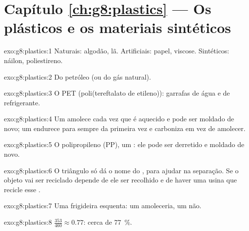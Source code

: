 \section*{Capítulo \ref{ch:g8:plastics} --- Os plásticos e os materiais sintéticos}

\begin{solution}{exo:g8:plastics:1}
Naturais: algodão, lã. Artificiais: papel, viscose. Sintéticos: náilon,
poliestireno.
\end{solution}

\begin{solution}{exo:g8:plastics:2}
Do petróleo (ou do gás natural).
\end{solution}

\begin{solution}{exo:g8:plastics:3}
O PET (poli(tereftalato de etileno)): garrafas de água e de refrigerante.
\end{solution}

\begin{solution}{exo:g8:plastics:4}
Um  amolece cada vez que é aquecido e pode ser moldado de
novo; um  endurece para sempre da primeira vez e carboniza em
vez de amolecer.
\end{solution}

\begin{solution}{exo:g8:plastics:5}
O polipropileno (PP), um : ele pode ser derretido e moldado de novo.
\end{solution}

\begin{solution}{exo:g8:plastics:6}
O triângulo só dá o nome do , para ajudar na separação. Se o
objeto vai ser reciclado depende de ele ser recolhido e de haver uma
usina que recicle esse .
\end{solution}

\begin{solution}{exo:g8:plastics:7}
Uma frigideira esquenta: um  amoleceria, um  não.
\end{solution}

\begin{solution}{exo:g8:plastics:8}
$\frac{353}{460} \approx 0.77$: cerca de \qty{77}{\percent}.
\end{solution}

